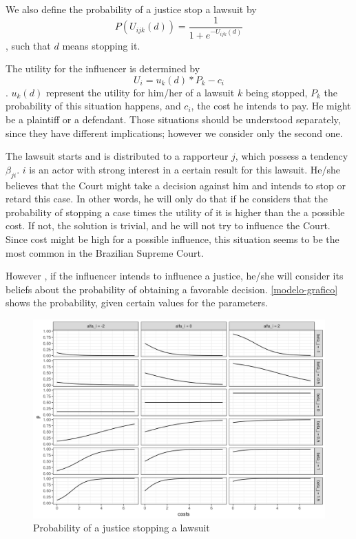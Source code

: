 \documentclass[12pt, a4paper]{article}
\begin{document}
We also define the probability of a justice stop a lawsuit by \begin{equation} P(U_{ijk}(d)) = \frac{1}{1+e^{-U_{ijk}(d)}}\end{equation}, such that $d$ means stopping it.


The utility for the influencer is determined by \begin{equation} U_{i} = u_{k}(d)*P_k - c_{i} \end{equation}. $u_{k}(d)$ represent the utility for him/her of a lawsuit $k$ being stopped, $P_k$ the probability of this situation happens, and $c_{i}$, the cost he intends to pay.   He might be a plaintiff or a defendant. Those situations should be understood separately, since they have different implications; however we consider only the second one.

The lawsuit starts and is distributed to a rapporteur $j$, which possess a tendency $\beta_{ji}$. $i$ is an actor with strong interest in a certain result for this lawsuit. He/she believes that the Court might take a decision against him and intends to stop or retard this case. In other words, he will only do that if he considers that the probability of stopping a case times the utility of it is higher than the a possible cost. If not, the solution is trivial, and he will not try to influence the Court. Since cost might be high for a possible influence, this situation seems to be the most common in the Brazilian Supreme Court.  

However , if the influencer intends to influence a justice, he/she will consider its beliefs about the probability of obtaining a favorable decision. \autoref{modelo-grafico} shows the probability, given certain values for the parameters.


\begin{figure}[htb]
\label{modelo-grafico}
\caption{Probability of a justice stopping a lawsuit }
\includegraphics[scale=.8]{modelo.png}
\centering
\end{figure}
\end{document}
